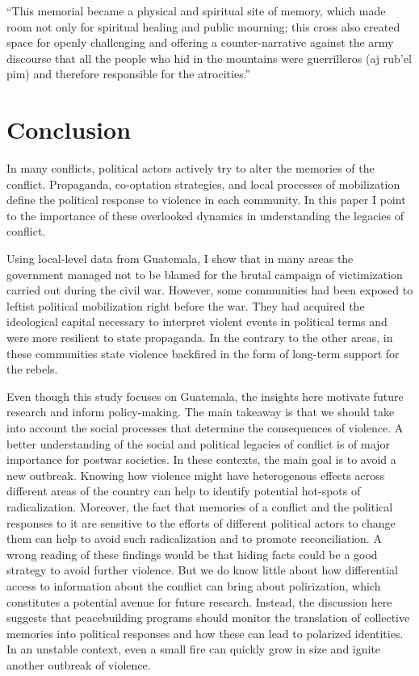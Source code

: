 \documentclass[12pt, notitlepage]{article}
\begin{document}
``This memorial became a physical and spiritual site of memory, which made room not only for spiritual healing and public mourning; this cross also created space for openly challenging and offering a counter-narrative against the army discourse that all the people who hid in the mountains were guerrilleros (aj rub’el pim) and therefore responsible for the atrocities.'' \citep[170--171]{Viaene:2011td}

\section*{Conclusion}

In many conflicts, political actors actively try to alter the memories of the conflict.
Propaganda, co-optation strategies, and local processes of mobilization define the political response to violence in each community.
In this paper I point to the importance of these overlooked dynamics in understanding the legacies of conflict.

Using local-level data from Guatemala, I show that in many areas the government managed not to be blamed for the brutal campaign of victimization carried out during the civil war.
However, some communities had been exposed to leftist political mobilization right before the war.
They had acquired the ideological capital necessary to interpret violent events in political terms and were more resilient to state propaganda.
In the contrary to the other areas, in these communities state violence backfired in the form of long-term support for the rebels.

Even though this study focuses on Guatemala, the insights here motivate future research and inform policy-making.
The main takeaway is that we should take into account the social processes that determine the consequences of violence.
A better understanding of the social and political legacies of conflict is of major importance for postwar societies.
In these contexts, the main goal is to avoid a new outbreak.
Knowing how violence might have heterogenous effects across different areas of the country can help to identify potential hot-spots of radicalization.
Moreover, the fact that memories of a conflict and the political responses to it are sensitive to the efforts of different political actors to change them can help to avoid such radicalization and to promote reconciliation.
A wrong reading of these findings would be that hiding facts could be a good strategy to avoid further violence.
But we do know little about how differential access to information about the conflict can bring about polirization, which constitutes a potential avenue for future research.
Instead, the discussion here suggests that peacebuilding programs should monitor the translation of collective memories into political responses and how these can lead to polarized identities.
In an unstable context, even a small fire can quickly grow in size and ignite another outbreak of violence.

\clearpage



% 
\end{document}
